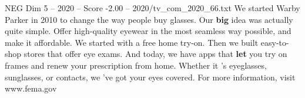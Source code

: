 \begin{textsample}{NEG Dim 5 – 2020 – Score -2.00 – 2020/tv\_com\_2020\_66.txt}  \label{ex:f5_neg_064}
We started Warby Parker in 2010 to change the way people buy glasses.
Our \textbf{big} idea was actually quite simple.
Offer high-quality eyewear in the most seamless way possible, and make it affordable.
We started with a free home try-on.
Then we built easy-to-shop stores that offer eye exams.
And today, we have apps that \textbf{let} you try on frames and renew your prescription from home.
Whether it 's eyeglasses, sunglasses, or contacts, we 've got your eyes covered.
For more information, visit www.fema.gov

\end{textsample}
